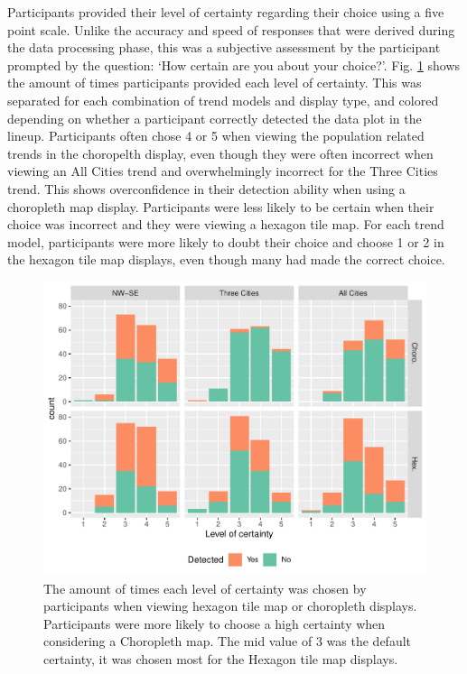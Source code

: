 \documentclass[12pt]{article}
\begin{document}
Participants provided their level of certainty regarding their choice
using a five point scale. Unlike the accuracy and speed of responses
that were derived during the data processing phase, this was a
subjective assessment by the participant prompted by the question: `How
certain are you about your choice?'. Fig. \ref{fig:certainty} shows the
amount of times participants provided each level of certainty. This was
separated for each combination of trend models and display type, and
colored depending on whether a participant correctly detected the data
plot in the lineup. Participants often chose 4 or 5 when viewing the
population related trends in the choropelth display, even though they
were often incorrect when viewing an All Cities trend and overwhelmingly
incorrect for the Three Cities trend. This shows overconfidence in their
detection ability when using a choropleth map display. Participants were
less likely to be certain when their choice was incorrect and they were
viewing a hexagon tile map. For each trend model, participants were more
likely to doubt their choice and choose 1 or 2 in the hexagon tile map
displays, even though many had made the correct choice.

\begin{figure}
\includegraphics[width=1\linewidth]{kobakiancook_files/figure-latex/certainty-1} \caption{The amount of times each level of certainty was chosen by participants when viewing hexagon tile map or choropleth displays. Participants were more likely to choose a high certainty when considering a Choropleth map. The mid value of 3 was the default certainty, it was chosen most for the Hexagon tile map displays.}\label{fig:certainty}
\end{figure}
\end{document}

